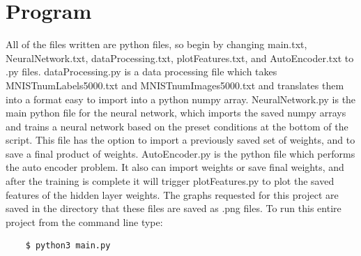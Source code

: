 \documentclass[12pt, letterpaper, twoside]{article}
\begin{document}
\section{Program}
All of the files written are python files, so begin by changing main.txt, NeuralNetwork.txt,
dataProcessing.txt, plotFeatures.txt, and AutoEncoder.txt to .py files. dataProcessing.py is a
data processing file which takes MNISTnumLabels5000.txt and MNISTnumImages5000.txt and translates
them into a format easy to import into a python numpy array. NeuralNetwork.py is the main python
file for the neural network, which imports the saved numpy arrays and trains a neural network based
on the preset conditions at the bottom of the script. This file has the option to import a previously
saved set of weights, and to save a final product of weights. AutoEncoder.py is the python file which
performs the auto encoder problem. It also can import weights or save final weights, and after the
training is complete it will trigger plotFeatures.py to plot the saved features of the hidden layer
weights. The graphs requested for this project are saved in the directory that these files are 
saved as .png files. To run this entire project from the command line type: 
\begin{lstlisting}
    $ python3 main.py
\end{lstlisting}
\end{document}
